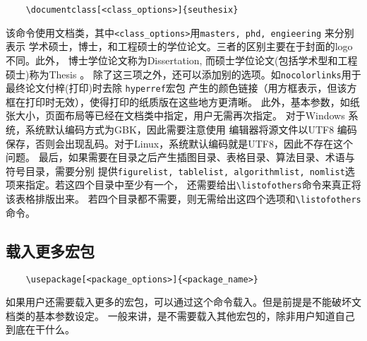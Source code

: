 \documentclass[figurelist,tablelist,algorithmlist,nomlist,masters]{seuthesix}
\begin{document}
{\color{magenta}
	\begin{verbatim}
	\documentclass[<class_options>]{seuthesix}
	\end{verbatim}
}
该命令使用\seuthesix 文档类，其中\verb+<class_options>+用\texttt{masters, phd, engieering} 来分别表示
学术硕士，博士，和工程硕士的学位论文。三者的区别主要在于封面的logo 不同。此外，
博士学位论文称为Dissertation, 而硕士学位论文(包括学术型和工程硕士)称为Thesis 。
除了这三项之外，还可以添加别的选项。如{\texttt{nocolorlinks}}用于最终论文付梓(打印)时去除
\texttt{hyperref}宏包
产生的颜色链接（用方框表示，但该方框在打印时无效），使得打印的纸质版在这些地方更清晰。
此外，基本参数，如纸张大小，页面布局等已经在文档类中指定，用户无需再次指定。
对于Windows 系统，系统默认编码方式为GBK，因此需要注意使用
编辑器将源文件以UTF8 编码保存，否则会出现乱码。对于Linux，系统默认编码就是UTF8，因此不存在这个问题。
最后，如果需要在目录之后产生插图目录、表格目录、算法目录、术语与符号目录，需要分别
提供\texttt{figurelist, tablelist, algorithmlist, nomlist}选项来指定。若这四个目录中至少有一个，
还需要给出\verb+\listofothers+命令来真正将该表格排版出来。
若四个目录都不需要，则无需给出这四个选项和\verb+\listofothers+命令。
\subsection{载入更多宏包}
{\color{magenta}
	\begin{verbatim}
	\usepackage[<package_options>]{<package_name>}
	\end{verbatim}
}
如果用户还需要载入更多的宏包，可以通过这个命令载入。但是前提是不能破坏\seuthesix 文档类的基本参数设定。
一般来讲，是不需要载入其他宏包的，除非用户知道自己到底在干什么。
\end{document}
